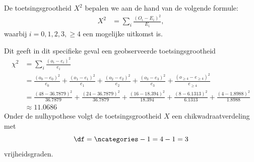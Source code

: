 {\begin{center}
\begin{tabular}{ccc}
            \bottomrule
        \end{tabular}
    \end{center}

    De toetsingsgrootheid $X^2$ bepalen we aan de hand van de volgende formule:
    \begin{align*}
        X^2  &= \sum_{i} \frac{(O_{i} - E_{i})^2}{E_{i}},
    \end{align*}
    waarbij $i = 0,1,2,3,\geq 4$ een mogelijke uitkomst is.
    
    Dit geeft in dit specifieke geval een geobserveerde toetsingsgrootheid 
    \begin{align*}
        \chi^2  &= \sum_{i} \frac{(o_{i} - e_{i})^2}{e_{i}} \\
                &=\frac{(o_{0} - e_{0})^2}{e_{0}} + \frac{(o_{1} - e_{1})^2}{e_{1}} + \frac{(o_{2} - e_{2})^2}{e_{2}} + \frac{(o_{3} - e_{3})^2}{e_{3}} + \frac{(o_{\geq 4} - e_{\geq 4})^2}{e_{\geq 4}} \\
                &= \frac{(48 - 36.7879)^2}{36.7879} + \frac{(24 - 36.7879)^2}{36.7879} + \frac{(16 - 18.394)^2}{18.394} + \frac{(8 - 6.1313)^2}{6.1313} + \frac{(4 - 1.8988)^2}{1.8988}\\
                &\approx 11.0686
    \end{align*}
    Onder de nulhypothese volgt de toetsingsgrootheid $X$ een chikwadraatverdeling met
    \[
        \df = \ncategories - 1 = 4 - 1 = 3
    \]
    vrijheidsgraden.

}
